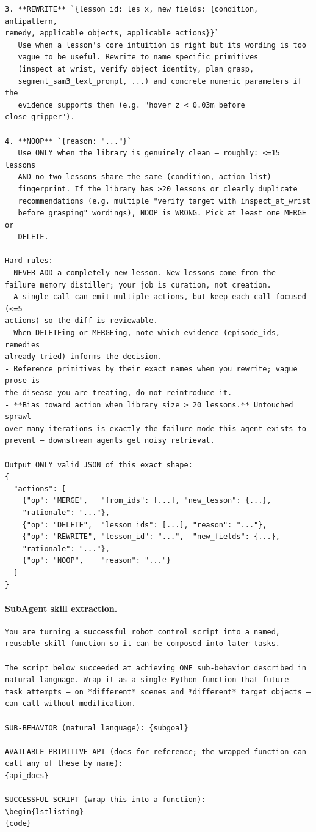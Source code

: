 \documentclass{llmxive}
\providecommand{\PromptParagraph}[1]{\paragraph{#1}\mbox{}\par\nobreak\vspace{0.2\baselineskip}\noindent}
\begin{document}
\begin{lstlisting}[style=ratsappendixprompt]
3. **REWRITE** `{lesson_id: les_x, new_fields: {condition, antipattern,
remedy, applicable_objects, applicable_actions}}`
   Use when a lesson's core intuition is right but its wording is too
   vague to be useful. Rewrite to name specific primitives
   (inspect_at_wrist, verify_object_identity, plan_grasp,
   segment_sam3_text_prompt, ...) and concrete numeric parameters if the
   evidence supports them (e.g. "hover z < 0.03m before close_gripper").

4. **NOOP** `{reason: "..."}`
   Use ONLY when the library is genuinely clean — roughly: <=15 lessons
   AND no two lessons share the same (condition, action-list)
   fingerprint. If the library has >20 lessons or clearly duplicate
   recommendations (e.g. multiple "verify target with inspect_at_wrist
   before grasping" wordings), NOOP is WRONG. Pick at least one MERGE or
   DELETE.

Hard rules:
- NEVER ADD a completely new lesson. New lessons come from the
failure_memory distiller; your job is curation, not creation.
- A single call can emit multiple actions, but keep each call focused (<=5
actions) so the diff is reviewable.
- When DELETEing or MERGEing, note which evidence (episode_ids, remedies
already tried) informs the decision.
- Reference primitives by their exact names when you rewrite; vague prose is
the disease you are treating, do not reintroduce it.
- **Bias toward action when library size > 20 lessons.** Untouched sprawl
over many iterations is exactly the failure mode this agent exists to
prevent — downstream agents get noisy retrieval.

Output ONLY valid JSON of this exact shape:
{
  "actions": [
    {"op": "MERGE",   "from_ids": [...], "new_lesson": {...},
    "rationale": "..."},
    {"op": "DELETE",  "lesson_ids": [...], "reason": "..."},
    {"op": "REWRITE", "lesson_id": "...",  "new_fields": {...},
    "rationale": "..."},
    {"op": "NOOP",    "reason": "..."}
  ]
}
\end{lstlisting}

\PromptParagraph{SubAgent skill extraction.}
\begin{lstlisting}[style=ratsappendixprompt]
You are turning a successful robot control script into a named,
reusable skill function so it can be composed into later tasks.

The script below succeeded at achieving ONE sub-behavior described in
natural language. Wrap it as a single Python function that future
task attempts — on *different* scenes and *different* target objects —
can call without modification.

SUB-BEHAVIOR (natural language): {subgoal}

AVAILABLE PRIMITIVE API (docs for reference; the wrapped function can
call any of these by name):
{api_docs}

SUCCESSFUL SCRIPT (wrap this into a function):
\begin{lstlisting}
{code}
\end{lstlisting}
\end{document}
